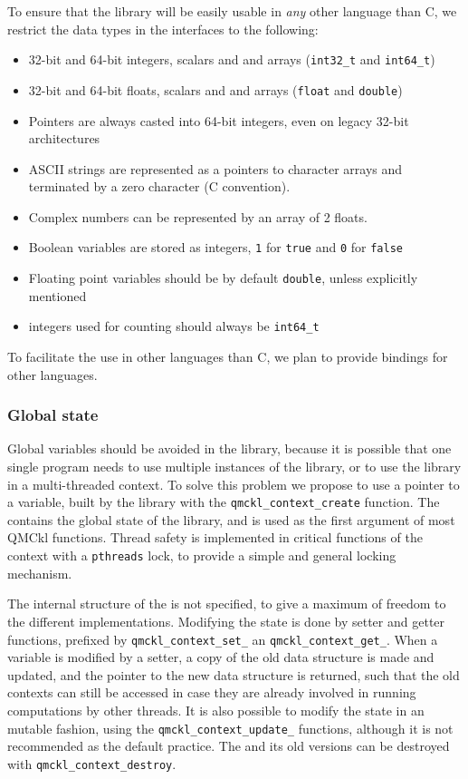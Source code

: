 To ensure that the library will be easily usable in \emph{any} other
language than C, we restrict the data types in the interfaces to the
following:
\begin{itemize}
\item 32-bit and 64-bit integers, scalars and and arrays
  (\texttt{int32_t} and \texttt{int64_t})
\item 32-bit and 64-bit floats, scalars and and arrays
  (\texttt{float} and \texttt{double})
\item Pointers are always casted into 64-bit integers, even on legacy 32-bit architectures
\item ASCII strings are represented as a pointers to character arrays
  and terminated by a zero character (C convention).
\item Complex numbers can be represented by an array of 2 floats.
\item Boolean variables are stored as integers, \texttt{1} for
\texttt{true} and \texttt{0} for \texttt{false}
\item Floating point variables should be by default
\texttt{double}, unless explicitly mentioned
\item integers used for counting should always be \texttt{int64_t}
\end{itemize}

To facilitate the  use in other languages than C, we plan to provide 
bindings for other languages.


\subsubsection{Global state}

Global variables should  be avoided in the library,  because it is
possible that one  single program needs to  use multiple instances
of the library, or to use the library in a multi-threaded context.
To solve this  problem we propose to use a pointer
to a {\context}  variable,  built   by  the  library   with  the
\texttt{qmckl_context_create} function. The
{\context} contains the global state of the library, and is used as
the first argument of most \ac{QMCkl} functions. Thread safety is 
implemented in critical functions of the context with a
\texttt{pthreads} lock, to provide a simple and general locking
mechanism.

The internal structure of the {\context}  is not specified, to give a
maximum of  freedom to  the different  implementations.  Modifying
the  state   is  done   by  setter   and  getter functions,   prefixed  by
\texttt{qmckl_context_set_}  an
\texttt{qmckl_context_get_}.
When a {\context} variable is modified by a setter, a copy of the old
data structure is made and updated, and the pointer to the new data
structure is returned, such that the old contexts can still be
accessed in case they are already involved in running computations by
other threads. It is also possible to modify the state in an mutable
fashion, using the \texttt{qmckl_context_update_} functions,
although it is not recommended as the default practice.
The {\context} and its old versions can be destroyed with
\texttt{qmckl_context_destroy}.


